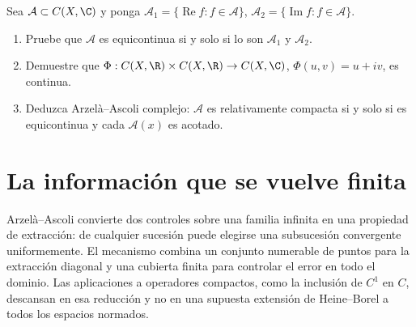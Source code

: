 \begin{ejercicio}\label{ej:lectura-27-5}
Sea $\mathcal A\subset C(X,\C)$ y ponga $\mathcal A_1=\{\operatorname{Re}f:f\in\mathcal A\}$, $\mathcal A_2=\{\operatorname{Im}f:f\in\mathcal A\}$.
\begin{enumerate}[label=(\roman*)]
\item Pruebe que $\mathcal A$ es equicontinua si y solo si lo son $\mathcal A_1$ y $\mathcal A_2$.
\item Demuestre que $\Phi:C(X,\R)\times C(X,\R)\to C(X,\C)$, $\Phi(u,v)=u+iv$, es continua.
\item Deduzca Arzelà--Ascoli complejo: $\mathcal A$ es relativamente compacta si y solo si es equicontinua y cada $\mathcal A(x)$ es acotado.
\end{enumerate}
\end{ejercicio}


\section{La información que se vuelve finita}
Arzelà--Ascoli convierte dos controles sobre una familia infinita en una propiedad de extracción: de cualquier sucesión puede elegirse una subsucesión convergente uniformemente. El mecanismo combina un conjunto numerable de puntos para la extracción diagonal y una cubierta finita para controlar el error en todo el dominio. Las aplicaciones a operadores compactos, como la inclusión de $C^1$ en $C$, descansan en esa reducción y no en una supuesta extensión de Heine--Borel a todos los espacios normados.
